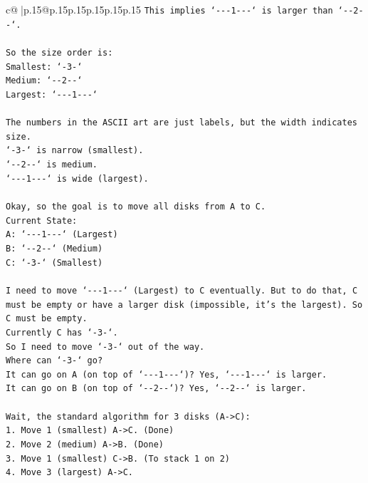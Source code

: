 \documentclass{article}
\begin{document}
{\begin{supertabular}{c@{$\;$}|p{.15\linewidth}@{}p{.15\linewidth}p{.15\linewidth}p{.15\linewidth}p{.15\linewidth}p{.15\linewidth}}
{{{\texttt{This implies `{-}{-}{-}1{-}{-}{-}` is larger than `{-}{-}2{-}{-}`.} \\
\\ 
\texttt{So the size order is:} \\
\texttt{Smallest: `{-}3{-}`} \\
\texttt{Medium: `{-}{-}2{-}{-}`} \\
\texttt{Largest: `{-}{-}{-}1{-}{-}{-}`} \\
\\ 
\texttt{The numbers in the ASCII art are just labels, but the width indicates size.} \\
\texttt{`{-}3{-}` is narrow (smallest).} \\
\texttt{`{-}{-}2{-}{-}` is medium.} \\
\texttt{`{-}{-}{-}1{-}{-}{-}` is wide (largest).} \\
\\ 
\texttt{Okay, so the goal is to move all disks from A to C.} \\
\texttt{Current State:} \\
\texttt{A: `{-}{-}{-}1{-}{-}{-}` (Largest)} \\
\texttt{B: `{-}{-}2{-}{-}` (Medium)} \\
\texttt{C: `{-}3{-}` (Smallest)} \\
\\ 
\texttt{I need to move `{-}{-}{-}1{-}{-}{-}` (Largest) to C eventually. But to do that, C must be empty or have a larger disk (impossible, it's the largest). So C must be empty.} \\
\texttt{Currently C has `{-}3{-}`.} \\
\texttt{So I need to move `{-}3{-}` out of the way.} \\
\texttt{Where can `{-}3{-}` go?} \\
\texttt{It can go on A (on top of `{-}{-}{-}1{-}{-}{-}`)? Yes, `{-}{-}{-}1{-}{-}{-}` is larger.} \\
\texttt{It can go on B (on top of `{-}{-}2{-}{-}`)? Yes, `{-}{-}2{-}{-}` is larger.} \\
\\ 
\texttt{Wait, the standard algorithm for 3 disks (A{-}>C):} \\
\texttt{1. Move 1 (smallest) A{-}>C. (Done)} \\
\texttt{2. Move 2 (medium) A{-}>B. (Done)} \\
\texttt{3. Move 1 (smallest) C{-}>B. (To stack 1 on 2)} \\
\texttt{4. Move 3 (largest) A{-}>C.} \\
}}}
\end{supertabular}}
\end{document}
